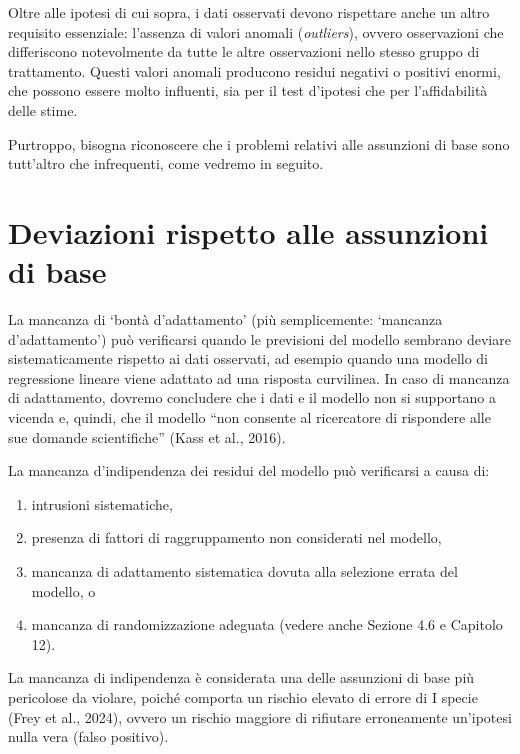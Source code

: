 \documentclass[
  12pt,
]{book}
\providecommand{\tightlist}{%
  \setlength{\itemsep}{0pt}\setlength{\parskip}{0pt}}
\begin{document}
Oltre alle ipotesi di cui sopra, i dati osservati devono rispettare anche un altro requisito essenziale: l'assenza di valori anomali (\emph{outliers}), ovvero osservazioni che differiscono notevolmente da tutte le altre osservazioni nello stesso gruppo di trattamento. Questi valori anomali producono residui negativi o positivi enormi, che possono essere molto influenti, sia per il test d'ipotesi che per l'affidabilità delle stime.

Purtroppo, bisogna riconoscere che i problemi relativi alle assunzioni di base sono tutt'altro che infrequenti, come vedremo in seguito.

\hypertarget{deviazioni-rispetto-alle-assunzioni-di-base}{%
\section{Deviazioni rispetto alle assunzioni di base}\label{deviazioni-rispetto-alle-assunzioni-di-base}}

La mancanza di `bontà d'adattamento' (più semplicemente: `mancanza d'adattamento') può verificarsi quando le previsioni del modello sembrano deviare sistematicamente rispetto ai dati osservati, ad esempio quando una modello di regressione lineare viene adattato ad una risposta curvilinea. In caso di mancanza di adattamento, dovremo concludere che i dati e il modello non si supportano a vicenda e, quindi, che il modello ``non consente al ricercatore di rispondere alle sue domande scientifiche'' (Kass et al., 2016).

La mancanza d'indipendenza dei residui del modello può verificarsi a causa di:

\begin{enumerate}
\def\labelenumi{\arabic{enumi}.}
\tightlist
\item
  intrusioni sistematiche,
\item
  presenza di fattori di raggruppamento non considerati nel modello,
\item
  mancanza di adattamento sistematica dovuta alla selezione errata del modello, o
\item
  mancanza di randomizzazione adeguata (vedere anche Sezione 4.6 e Capitolo 12).
\end{enumerate}

La mancanza di indipendenza è considerata una delle assunzioni di base più pericolose da violare, poiché comporta un rischio elevato di errore di I specie (Frey et al., 2024), ovvero un rischio maggiore di rifiutare erroneamente un'ipotesi nulla vera (falso positivo).
\end{document}
